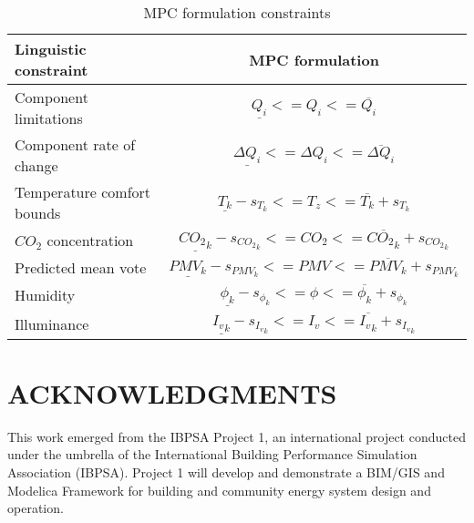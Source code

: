 \documentclass[10pt]{extarticle}
\begin{document}
\renewcommand{\arraystretch}{2.5}
\begin{table}[h]
	\centering
	\caption{MPC formulation constraints}
	\label{tab:mpc_form:constraints}
	\begin{tabular}{l|c}
		\toprule
		\textbf{Linguistic constraint}  & \textbf{MPC formulation} \\
		\midrule
		Component limitations & $ \underline{Q_i}  <= Q_i <= \overline{Q_i} $ \\ 
		Component rate of change & $ \underline{\Delta Q_i}  <= \Delta Q_i <= \overline{\Delta Q_i} $ \\ 
		Temperature comfort bounds &   $ \underline{T_k} - s_{T_k} <= T_z <= \overline{T_k} + s_{T_k} $ \\
		$CO_2$ concentration & $ \underline{{CO_2}_k} - s_{{CO_2}_k} <= CO_2 <= \overline{{CO_2}_k} + s_{{CO_2}_k} $  \\
		Predicted mean vote & $ \underline{PMV_k} - s_{PMV_k} <= PMV <= \overline{PMV_k} + s_{PMV_k} $  \\
		Humidity &  $ \underline{\phi_k} - s_{\phi_k} <= \phi <= \overline{\phi_k} + s_{\phi_k} $  \\
		Illuminance & $ \underline{{I_v}_k} - s_{{I_v}_k} <= I_v <= \overline{{I_v}_k} + s_{{I_v}_k} $  \\
		\bottomrule 
	\end{tabular}
\end{table}




\vspace{24pt}


\section*{ACKNOWLEDGMENTS}

This work emerged from the IBPSA Project 1, an international project conducted under the umbrella of the International Building Performance Simulation Association (IBPSA). Project 1 will develop and demonstrate a BIM/GIS and Modelica Framework for building and community energy system design and operation.
\end{document}
